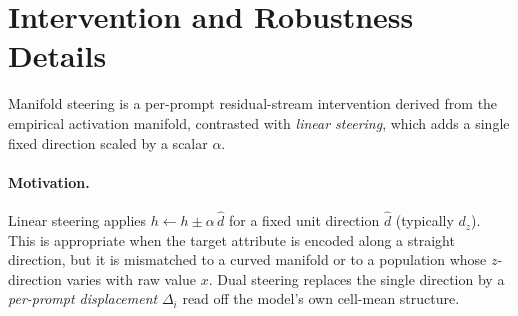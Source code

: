\documentclass{article}
\newcommand{\primalz}{\ensuremath{d_{z}}}
\begin{document}




\section{Intervention and Robustness Details}
\label{app:dual-steering}

Manifold steering is a per-prompt residual-stream intervention derived from the empirical activation manifold, contrasted with \emph{linear steering}, which adds a single fixed direction scaled by a scalar $\alpha$.

\paragraph{Motivation.}
Linear steering applies $h\leftarrow h\pm\alpha\,\hat d$ for a fixed unit direction $\hat d$ (typically \primalz). This is appropriate when the target attribute is encoded along a straight direction, but it is mismatched to a curved manifold or to a population whose $z$-direction varies with raw value $x$. Dual steering replaces the single direction by a \emph{per-prompt displacement} $\Delta_i$ read off the model's own cell-mean structure.
\end{document}
